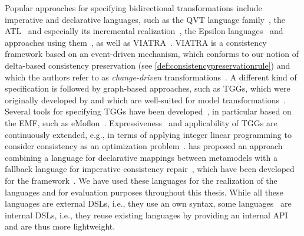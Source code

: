 Popular approaches for specifying bidirectional transformations include imperative and declarative languages, such as the \gls{QVT} language family~\cite{qvt}, the \gls{ATL}~\cite{jouault2006a,xiong2007backwardTransformation-ASE} and especially its incremental realization~\cite{martinez2017incrementalATL-SCP}, the Epsilon languages~\cite{kolovos2014epsilon-Book} and approaches using them~\cite{samimi-dehkordi2018evlStrace-IST}, as well as \gls{VIATRA}~\cite{bergmann2015viatra-ICMT, varro2016viatra-SoSym}.
\gls{VIATRA} is a consistency framework based on an event-driven mechanism, which conforms to our notion of delta-based consistency preservation (see \autoref{def:consistencypreservationrule}) and which the authors refer to as \emph{change-driven} transformations~\cite{bergmann2012changeDriven-SoSym}.
A different kind of specification is followed by graph-based approaches, such as \glspl{TGG}, which were originally developed by \textcite{schuerr1995a} and which are well-suited for model transformations~\cite{anjorin2014EfficientSynchronizationTGG-ECMFA}.
Several tools for specifying \glspl{TGG} have been developed~\cite{leblebici2014IncrementalTGGSurvey-GTVMT}, in particular based on the \gls{EMF}, such as eMoflon~\cite{anjorin2014diss}.
Expressiveness~\cite{anjorin2012complexManipulationTGG-BX} and applicability of \glspl{TGG} are continuously extended, e.g., in terms of applying integer linear programming to consider consistency as an optimization problem~\cite{weidmann2019TGGandILP-SLE,weidmann2020TGGsAndILPSchemaCompliance-FASE}.
 has proposed an approach combining a language for declarative mappings between metamodels with a fallback language for imperative consistency repair~, which have been developed for the \vitruv framework~.
We have used these languages for the realization of the \commonalities languages and for evaluation purposes throughout this thesis.
While all these languages are external \glspl{DSL}, i.e., they use an own syntax, some languages~\cite{buchmann2018bxtend-Modelsward, hinkel2019internalTransformation-SoSym} are internal \glspl{DSL}, i.e., they reuse existing languages by providing an internal \gls{API} and are thus more lightweight.

